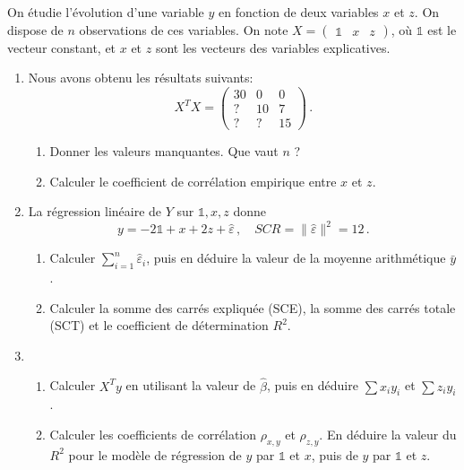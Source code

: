 \documentclass{../td_um}
\providecommand{\1}{\mathds{1}}
\begin{document}
	\exo{} On étudie l'évolution d'une variable $y$ en fonction de deux variables $x$ et $z$. On dispose de $n$ observations de ces variables. On note $X=\begin{pmatrix}\1 & x & z\end{pmatrix}$, où $\1$ est le vecteur constant, et $x$ et $z$ sont les vecteurs des variables explicatives.
		\begin{enumerate}
			\item Nous avons obtenu les résultats suivants:
			\[
			X^T X=\begin{pmatrix}
				30 & 0 & 0 \\
				? & 10 & 7 \\
				? & ? & 15
			\end{pmatrix}\,.
			\]
			\begin{enumerate}
				\item Donner les valeurs manquantes. Que vaut $n$ ?
				\item Calculer le coefficient de corrélation empirique entre $x$ et $z$.
			\end{enumerate}
			\item La régression linéaire de $Y$ sur $\1 , x, z$ donne
			\[
			y=-2 \1 + x + 2 z + \hat{\varepsilon}\,, \quad S C R = \|\hat{\varepsilon}\|^{2} = 12\,.
			\]
			\begin{enumerate}
				\item Calculer $\sum_{i=1}^n \hat \varepsilon_i$, puis en déduire la valeur de la moyenne arithmétique $\bar{y}$.
				\item Calculer la somme des carrés expliquée (SCE), la somme des carrés totale (SCT) et le coefficient de détermination $R^{2}$. %
			\end{enumerate}
		\item 
		\begin{enumerate}
			\item Calculer $X^T y$ en utilisant la valeur de $\hat{\beta}$, puis en déduire $\sum x_{i} y_{i}$ et $\sum z_{i} y_{i}$.
			\item Calculer les coefficients de corrélation $\rho_{x,y}$ et $\rho_{z,y}$. En déduire la valeur du $R^{2}$ pour le modèle de régression de $y$ par $\1 $ et $x$, puis de $y$ par $\1 $ et $z$.%
		\end{enumerate}
	\end{enumerate}

\cor{\newpage}
	
\end{document}
